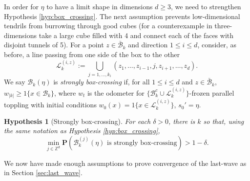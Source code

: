 \documentclass[aap]{imsart}
\newcommand{\Z}{\mathbb{Z}}
\newtheorem{hyp}{Hypothesis}
\begin{document}
In order for $\eta$ to have a limit shape in dimensions $d \geq 3$, we need to strengthen 
Hypothesis \ref{hyp:box_crossing}. The next assumption prevents low-dimensional tendrils from burrowing through good cubes (for a counterexample in three-dimensions take a large cube filled with 4
and connect each of the faces with disjoint tunnels of 5). For a point $z \in \bar{\mathcal{B}}_k$ and direction $1 \leq i \leq d$, consider, as before, a line passing from one side of the box to the other 
\begin{equation}
\mathcal{L}_k^{(i,z)} := \bigcup_{j=1,\ldots,k_i} (z_1, \ldots, z_{i-1}, j, z_{i+1}, \ldots, z_d).
\end{equation}
We say $\mathcal{B}_k(\eta)$ is {\it strongly box-crossing} if, for all $1 \leq i \leq d$ and $z \in \bar{\mathcal{B}}_k$, $w_{|k|} \geq 1\{x \in \mathcal{B}_k \}$,
where $w_t$ is the odometer for $\{\mathcal{B}_k^c \cup \mathcal{L}_k^{(i,z)}\}$-frozen parallel toppling 
with initial conditions $w_0(x) = 1\{x \in \mathcal{L}_k^{(i,z)}\}$, $s_0' = \eta$.

\begin{hyp}[Strongly box-crossing] \label{hyp:box_filling}
	For each $\delta > 0$, there is $k$ so that, using the same notation as Hypothesis \ref{hyp:box_crossing}, 
	\[
	\min_{j \in \Z^d} \mathbf{P}(\mathcal{B}^{(j)}_k(\eta) \mbox{ is strongly box-crossing}) > 1 - \delta.
	\]
\end{hyp}




We now have made enough assumptions to prove convergence of the last-wave as in Section \ref{sec:last_wave}. 
\end{document}
